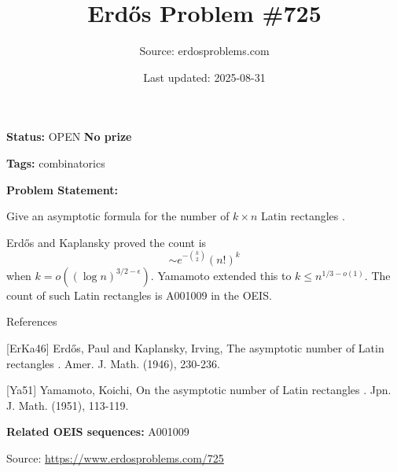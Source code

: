 \documentclass{article}
\title{Erd\H{o}s Problem \#725}
\date{Last updated: 2025-08-31}
\author{Source: erdosproblems.com}
\begin{document}
\maketitle

\noindent\textbf{Status:} OPEN \quad \textbf{No prize}

\noindent\textbf{Tags:} combinatorics

\medskip

\noindent\textbf{Problem Statement:}

Give an asymptotic formula for the number of $k\times n$ Latin rectangles .




Erd\H{o}s and Kaplansky \cite{ErKa46} proved the count is\[\sim e^{-\binom{k}{2}}(n!)^k\]when $k=o((\log n)^{3/2-\epsilon})$. Yamamoto \cite{Ya51} extended this to $k\leq n^{1/3-o(1)}$. The count of such Latin rectangles is A001009 in the OEIS.




References

[ErKa46] Erd\H{o}s, Paul and Kaplansky, Irving, The asymptotic number of Latin rectangles . Amer. J. Math. (1946), 230-236.

[Ya51] Yamamoto, Koichi, On the asymptotic number of Latin rectangles . Jpn. J. Math. (1951), 113-119.

\noindent\textbf{Related OEIS sequences:} A001009


\bigskip
\noindent\small{Source: \url{https://www.erdosproblems.com/725}}
\end{document}
